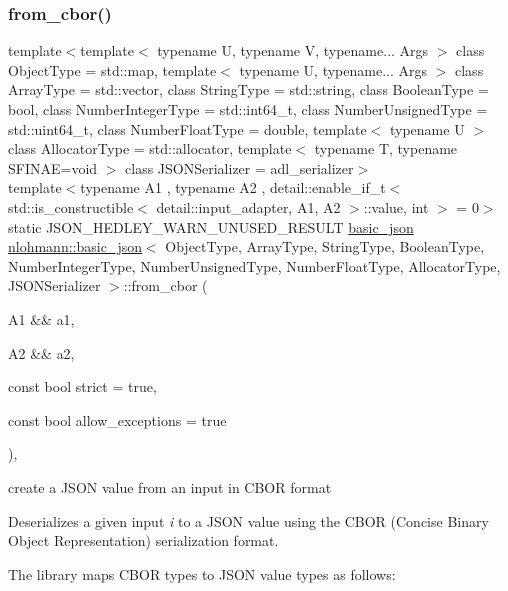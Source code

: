\subsubsection{\texorpdfstring{from\+\_\+cbor()}{from\_cbor()}\hspace{0.1cm}{\footnotesize\ttfamily [2/2]}}
{\footnotesize\ttfamily template$<$template$<$ typename U, typename V, typename... Args $>$ class Object\+Type = std\+::map, template$<$ typename U, typename... Args $>$ class Array\+Type = std\+::vector, class String\+Type  = std\+::string, class Boolean\+Type  = bool, class Number\+Integer\+Type  = std\+::int64\+\_\+t, class Number\+Unsigned\+Type  = std\+::uint64\+\_\+t, class Number\+Float\+Type  = double, template$<$ typename U $>$ class Allocator\+Type = std\+::allocator, template$<$ typename T, typename S\+F\+I\+N\+A\+E=void $>$ class J\+S\+O\+N\+Serializer = adl\+\_\+serializer$>$ \\
template$<$typename A1 , typename A2 , detail\+::enable\+\_\+if\+\_\+t$<$ std\+::is\+\_\+constructible$<$ detail\+::input\+\_\+adapter, A1, A2 $>$\+::value, int $>$  = 0$>$ \\
static J\+S\+O\+N\+\_\+\+H\+E\+D\+L\+E\+Y\+\_\+\+W\+A\+R\+N\+\_\+\+U\+N\+U\+S\+E\+D\+\_\+\+R\+E\+S\+U\+LT \mbox{\hyperlink{classnlohmann_1_1basic__json}{basic\+\_\+json}} \mbox{\hyperlink{classnlohmann_1_1basic__json}{nlohmann\+::basic\+\_\+json}}$<$ Object\+Type, Array\+Type, String\+Type, Boolean\+Type, Number\+Integer\+Type, Number\+Unsigned\+Type, Number\+Float\+Type, Allocator\+Type, J\+S\+O\+N\+Serializer $>$\+::from\+\_\+cbor (\begin{DoxyParamCaption}\item[{A1 \&\&}]{a1,  }\item[{A2 \&\&}]{a2,  }\item[{const bool}]{strict = {\ttfamily true},  }\item[{const bool}]{allow\+\_\+exceptions = {\ttfamily true} }\end{DoxyParamCaption})\hspace{0.3cm}{\ttfamily [inline]}, {\ttfamily [static]}}



create a J\+S\+ON value from an input in C\+B\+OR format 

Deserializes a given input {\itshape i} to a J\+S\+ON value using the C\+B\+OR (Concise Binary Object Representation) serialization format.

The library maps C\+B\+OR types to J\+S\+ON value types as follows\+:


